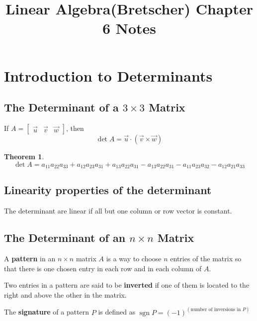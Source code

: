 \documentclass[letter]{article}
\title{Linear Algebra(Bretscher) Chapter 6 Notes}
\date{}
\newtheorem{theorem}{Theorem}[section]
\newenvironment{definition}[1][Definition]{\begin{trivlist}
\item[\hskip \labelsep {\bfseries #1}]}{\end{trivlist}}
\begin{document}
\maketitle
\vspace{-.5in}

\section{Introduction to Determinants}
\subsection{The Determinant of a $3\times 3$ Matrix}
\begin{definition}
If $A = \begin{bmatrix}
\vec u & \vec v & \vec w
\end{bmatrix}$, then
\[
\det A = \vec u \cdot (\vec v \times \vec w)
\]
\end{definition}

\begin{theorem}
\[\det A =  a_{11}a_{22}a_{33} + a_{12}a_{23}a_{31} + a_{13}a_{22}a_{31} - a_{13}a_{22}a_{31} - a_{11}a_{23}a_{32} - a_{12}a_{21}a_{33}\]
\end{theorem}

\subsection{Linearity properties of the determinant}
The determinant are linear if all but one column or row vector is constant.

\subsection{The Determinant of an $n \times n$ Matrix}
\begin{definition}
A \textbf{pattern} in an $n \times n$ matrix $A$ is a way to choose $n$ entries of the matrix so that there is one chosen entry in each row and in each column of $A$.
\end{definition}

\begin{definition}
Two entries in a pattern are said to be \textbf{inverted} if one of them is located to the right and above the other in the matrix.
\end{definition}

\begin{definition}
The \textbf{signature} of a pattern $P$ is defined as $\operatorname{sgn} P = (-1)^{(\text{number of inversions in $P$})}$
\end{definition}
\end{document}

